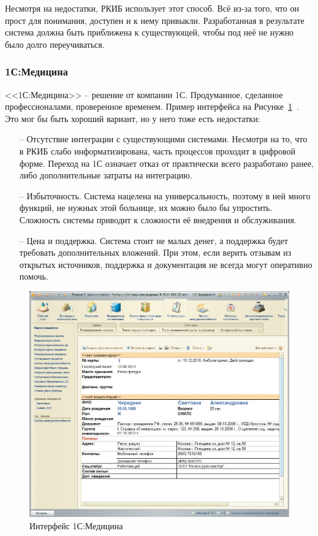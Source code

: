 \documentclass[a4paper,article]{article}
\begin{document}
\begin{sloppypar}
        Несмотря на недостатки, РКИБ использует этот способ. Всё из-за того, что он прост для понимания, доступен и к нему привыкли. Разработанная в результате система должна быть приближена к существующей, чтобы под неё не нужно было долго переучиваться.

    \subsubsection{1С:Медицина}

        <<1С:Медицина>> -- решение от компании 1С. Продуманное, сделанное профессионалами, проверенное временем. Пример интерфейса на Рисунке~\ref{fig:Интерфейс 1С:Медицина}~\cite{1cmedicine}. Это мог бы быть хороший вариант, но у него тоже есть недостатки:

        \begin{itemize}[nolistsep]
            \item[--] Отсутствие интеграции с существующими системами. Несмотря на то, что в РКИБ слабо информатизирована, часть процессов проходит в цифровой форме. Переход на 1С означает отказ от практически всего разработано ранее, либо дополнительные затраты на интеграцию.
            \item[--] Избыточность. Система нацелена на универсальность, поэтому в ней много функций, не нужных этой больнице, их можно было бы упростить. Сложность системы приводит к сложности её внедрения и обслуживания.
            \item[--] Цена и поддержка. Система стоит не малых денег, а поддержка будет требовать дополнительных вложений. При этом, если верить отзывам из открытых источников, поддержка и документация не всегда могут оперативно помочь.
        \end{itemize}

        \begin{figure}[h]
            \centering
            \includegraphics[width=0.6\linewidth]{Интерфейс 1С:Медицина.png}
            \caption{\centering Интерфейс 1С:Медицина}
            \label{fig:Интерфейс 1С:Медицина}
        \end{figure}
        

\end{sloppypar}
\end{document}
